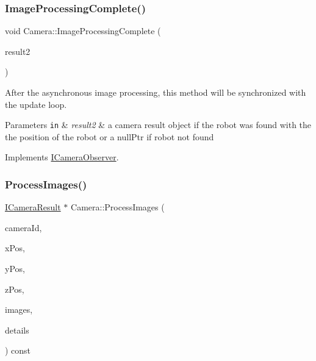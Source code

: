 \subsubsection{\texorpdfstring{Image\+Processing\+Complete()}{ImageProcessingComplete()}}
{\footnotesize\ttfamily void Camera\+::\+Image\+Processing\+Complete (\begin{DoxyParamCaption}\item[{\hyperlink{classICameraResult}{I\+Camera\+Result} $\ast$}]{result2 }\end{DoxyParamCaption})\hspace{0.3cm}{\ttfamily [virtual]}}



After the asynchronous image processing, this method will be synchronized with the update loop. 


\begin{DoxyParams}[1]{Parameters}
\mbox{\tt in}  & {\em result2} & a camera result object if the robot was found with the the position of the robot or a null\+Ptr if robot not found \\
\hline
\end{DoxyParams}


Implements \hyperlink{classICameraObserver_a7d261bd08d570d05032e61b2d5252c88}{I\+Camera\+Observer}.

\mbox{\label{classCamera_a792611ad34a1c595b61b7c72ce1d5e32}} 
\subsubsection{\texorpdfstring{Process\+Images()}{ProcessImages()}}
{\footnotesize\ttfamily \hyperlink{classICameraResult}{I\+Camera\+Result} $\ast$ Camera\+::\+Process\+Images (\begin{DoxyParamCaption}\item[{int}]{camera\+Id,  }\item[{double}]{x\+Pos,  }\item[{double}]{y\+Pos,  }\item[{double}]{z\+Pos,  }\item[{const std\+::vector$<$ \hyperlink{structRawCameraImage}{Raw\+Camera\+Image} $>$ \&}]{images,  }\item[{picojson\+::object \&}]{details }\end{DoxyParamCaption}) const\hspace{0.3cm}{\ttfamily [virtual]}}



